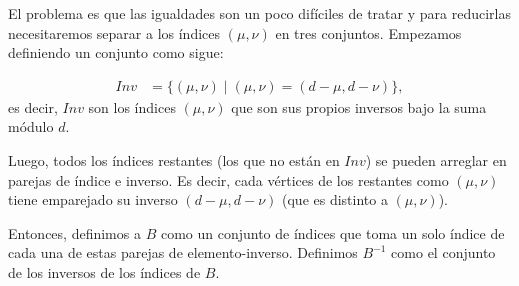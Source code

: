 El problema es que las igualdades son un poco difíciles de tratar y
para reducirlas necesitaremos separar a los índices $(\mu, \nu)$ en tres conjuntos. 
Empezamos definiendo un conjunto como sigue:

\begin{align*}
Inv &= \{(\mu,\nu)\; | \; (\mu , \nu) = (d-\mu, d-\nu)\},
\end{align*}
es decir, $Inv$ son los índices $(\mu,\nu)$ que son sus propios inversos bajo la suma módulo $d$. 

Luego, todos los índices restantes (los que no están en $Inv$) se pueden arreglar en parejas de índice e inverso. Es decir, cada vértices  de los restantes como $(\mu,\nu)$ tiene emparejado su inverso $(d-\mu,d-\nu)$ (que es distinto a $(\mu,\nu)$). 

Entonces, definimos a $B$ como un conjunto de  índices que toma un solo índice de cada una de estas parejas de elemento-inverso. Definimos $B^{-1}$ como el conjunto de los inversos de los índices de $B$. \\

